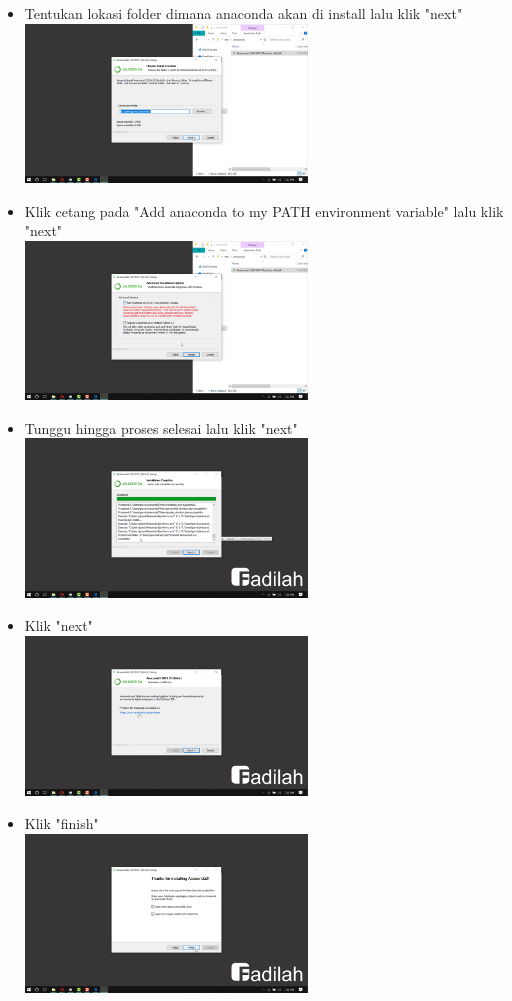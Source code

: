 \documentclass[a4paper,12pt]{report}
\begin{document}
\begin{itemize}
	\item Tentukan lokasi folder dimana anaconda akan di install lalu klik "next"\\
	\includegraphics[width=7.5cm]{gambar/anaconda/Screenshot (63).png} 
	\item Klik cetang pada "Add anaconda to my PATH environment variable" lalu klik "next"\\
	\includegraphics[width=7.5cm]{gambar/anaconda/Screenshot (66).png} 
	\item Tunggu hingga proses selesai lalu klik "next"\\
	\includegraphics[width=7.5cm]{gambar/anaconda/Screenshot (93).png} 
	\item Klik "next"\\
	 \includegraphics[width=7.5cm]{gambar/anaconda/Screenshot (96).png} 
	\item Klik "finish"\\
	\includegraphics[width=7.5cm]{gambar/anaconda/Screenshot (95).png} 
\end{itemize}
\end{document}
